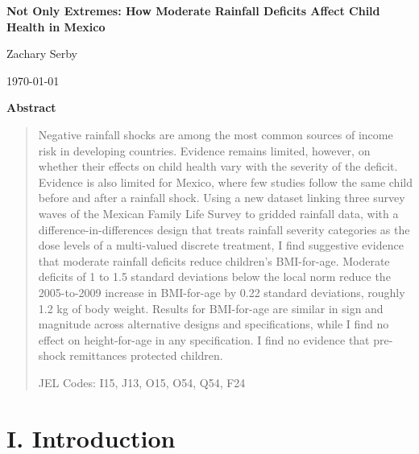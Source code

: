 \begin{titlepage}
\begin{center}
\vspace*{1.2in}
{\LARGE\bfseries Not Only Extremes: How Moderate Rainfall Deficits Affect Child Health in Mexico\par}
\vspace{0.3in}
{\large Zachary Serby\par}
\vspace{0.15in}
{\large \today\par}
\vspace{0.3in}
{\bfseries Abstract\par}
\end{center}
\begin{quote}
Negative rainfall shocks are among the most common sources of income risk in developing countries. Evidence remains limited, however, on whether their effects on child health vary with the severity of the deficit. Evidence is also limited for Mexico, where few studies follow the same child before and after a rainfall shock. Using a new dataset linking three survey waves of the Mexican Family Life Survey to gridded rainfall data, with a difference-in-differences design that treats rainfall severity categories as the dose levels of a multi-valued discrete treatment, I find suggestive evidence that moderate rainfall deficits reduce children's BMI-for-age. Moderate deficits of 1 to 1.5 standard deviations below the local norm reduce the 2005-to-2009 increase in BMI-for-age by 0.22 standard deviations, roughly 1.2 kg of body weight. Results for BMI-for-age are similar in sign and magnitude across alternative designs and specifications, while I find no effect on height-for-age in any specification. I find no evidence that pre-shock remittances protected children.

\vspace{0.15in}
JEL Codes: I15, J13, O15, O54, Q54, F24
\end{quote}
\end{titlepage}

\section*{I. Introduction}\label{sec:I}

